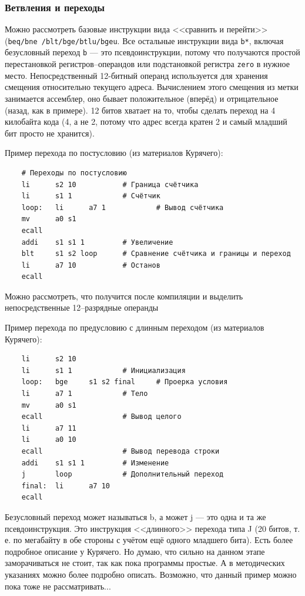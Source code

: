 \subsubsection{Ветвления и переходы}

Можно рассмотреть базовые инструкции вида <<сравнить и перейти>> \\ (\verb|beq/bne /blt/bge/btlu/bgeu|. Все остальные инструкции вида \verb|b*|, включая безусловный переход \verb|b| --- это псевдоинструкции, потому что получаются простой перестановкой регистров--операндов или подстановкой регистра \verb|zero| в нужное место. Непосредственный 12-битный операнд используется для хранения смещения относительно текущего адреса. Вычислением этого смещения из метки занимается ассемблер, оно бывает положительное (вперёд) и отрицательное (назад, как в примере). 12 битов хватает на то, чтобы сделать переход на 4 килобайта кода (4, а не 2, потому что адрес всегда кратен 2 и самый младший бит просто не хранится).

Пример перехода по постусловию (из материалов Курячего):
\begin{verbatim}
    # Переходы по постусловию
    li      s2 10           # Граница счётчика
    li      s1 1            # Счётчик
    loop:   li      a7 1            # Вывод счётчика
    mv      a0 s1
    ecall
    addi    s1 s1 1         # Увеличение
    blt     s1 s2 loop      # Сравнение счётчика и границы и переход
    li      a7 10           # Останов
    ecall
\end{verbatim}
Можно рассмотреть, что получится после компиляции и выделить непосредственные 12--разрядные операнды

Пример перехода по предусловию с длинным переходом (из материалов Курячего):
\begin{verbatim}
    li      s2 10
    li      s1 1            # Инициализация
    loop:   bge     s1 s2 final     # Проерка условия
    li      a7 1            # Тело
    mv      a0 s1
    ecall                   # Вывод целого
    li      a7 11
    li      a0 10
    ecall                   # Вывод перевода строки
    addi    s1 s1 1         # Изменение
    j       loop            # Дополнительный переход
    final:  li      a7 10
    ecall\end{verbatim}
Безусловный переход может называться b, а может j — это одна и та же псевдоинструкция. Это инструкция <<длинного>> перехода типа J (20 битов, т. е. по мегабайту в обе стороны с учётом ещё одного младшего бита). Есть более подробное описание у Курячего. Но думаю, что сильно на данном этапе заморачиваться не стоит, так как пока программы простые. А в методических указаниях можно более подробно описать. Возможно, что данный пример можно пока тоже не рассматривать...

